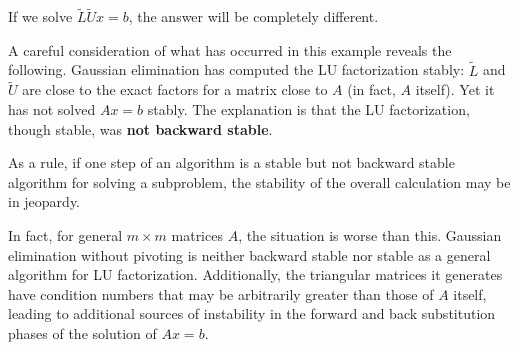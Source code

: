 If we solve $\tilde L \tilde U x = b$, the answer will be completely different.  

A careful consideration of what has occurred in this example reveals the following. Gaussian elimination has computed the LU factorization stably: $\tilde{L}$ and $\tilde{U}$ are close to the exact factors for a matrix close to $A$ (in fact, $A$ itself). Yet it has not solved $A x=b$ stably. The explanation is that the LU factorization, though stable, was \textbf{not backward stable}. 


\begin{note}
    As a rule, if one step of an algorithm is a stable but not backward stable algorithm for solving a subproblem, the stability of the overall calculation may be in jeopardy.
\end{note}

In fact, for general $m \times m$ matrices $A$, the situation is worse than this. Gaussian elimination without pivoting is neither backward stable nor stable as a general algorithm for LU factorization. Additionally, the triangular matrices it generates have condition numbers that may be arbitrarily greater than those of $A$ itself, leading to additional sources of instability in the forward and back substitution phases of the solution of $A x=b$.